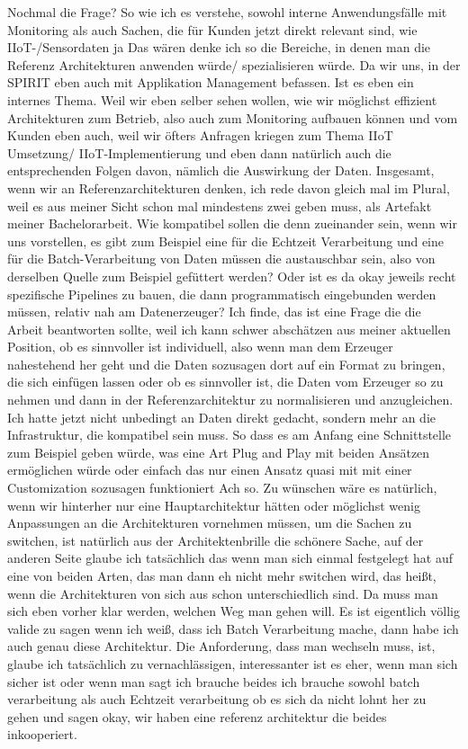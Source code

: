 \PA	 Nochmal die Frage?
\LF	So wie ich es verstehe, sowohl interne Anwendungsfälle mit Monitoring als auch Sachen, die für Kunden jetzt direkt relevant sind, wie \ac{IIoT}-/Sensordaten
\PA	 ja
\LF	 Das wären denke ich so die Bereiche, in denen man die Referenz Architekturen anwenden würde/ spezialisieren würde.
\PA	 Da wir uns, in der SPIRIT eben auch mit Applikation Management befassen. Ist es eben ein internes Thema. Weil wir eben selber sehen wollen, wie wir möglichst effizient Architekturen zum Betrieb, also auch zum Monitoring aufbauen können und vom Kunden eben auch, weil wir öfters Anfragen kriegen zum Thema \ac{IIoT} Umsetzung/ \ac{IIoT}-Implementierung und eben dann natürlich auch die entsprechenden Folgen davon, nämlich die Auswirkung der Daten.
\LF	Insgesamt, wenn wir an Referenzarchitekturen denken, ich rede davon gleich mal im Plural, weil es aus meiner Sicht schon mal mindestens zwei geben muss, als Artefakt meiner Bachelorarbeit. Wie kompatibel sollen die denn zueinander sein, wenn wir uns vorstellen, es gibt zum Beispiel eine für die Echtzeit Verarbeitung und eine für die Batch-Verarbeitung von Daten müssen die austauschbar sein, also von derselben Quelle zum Beispiel gefüttert werden? Oder ist es da okay jeweils recht spezifische Pipelines zu bauen, die  dann programmatisch eingebunden werden müssen, relativ nah am Datenerzeuger?
\PA	 Ich finde, das ist eine Frage die die Arbeit beantworten sollte, weil ich kann schwer abschätzen aus meiner aktuellen Position, ob es sinnvoller ist individuell, also wenn man dem Erzeuger nahestehend her geht  und  die Daten sozusagen dort auf ein Format zu bringen, die sich einfügen lassen oder ob es sinnvoller ist, die Daten vom Erzeuger so zu nehmen und dann in der Referenzarchitektur zu normalisieren und anzugleichen.
\LF	 Ich hatte jetzt nicht unbedingt an Daten direkt gedacht, sondern mehr an die Infrastruktur, die kompatibel sein muss. So dass es am Anfang eine Schnittstelle zum Beispiel geben würde, was eine Art Plug and Play mit beiden Ansätzen ermöglichen würde oder einfach das nur einen Ansatz quasi mit mit einer Customization sozusagen funktioniert
\PA	Ach so. Zu wünschen wäre es natürlich, wenn wir hinterher nur eine Hauptarchitektur hätten oder möglichst wenig Anpassungen an die Architekturen vornehmen müssen, um die Sachen zu switchen, ist natürlich aus der Architektenbrille die schönere Sache, auf der anderen Seite glaube ich tatsächlich das wenn man sich einmal festgelegt hat auf eine von beiden Arten, das man dann eh nicht mehr switchen wird, das heißt, wenn die Architekturen von sich aus schon unterschiedlich sind. Da muss man sich eben vorher klar werden, welchen Weg man gehen will. Es ist eigentlich völlig valide zu sagen wenn ich weiß, dass ich Batch Verarbeitung mache, dann habe ich auch genau diese Architektur. Die Anforderung, dass man wechseln muss, ist, glaube ich tatsächlich zu vernachlässigen, interessanter ist es eher, wenn man sich sicher ist oder wenn man sagt ich brauche beides ich brauche sowohl batch verarbeitung als auch Echtzeit verarbeitung ob es sich da nicht lohnt her zu gehen und sagen okay, wir haben eine referenz architektur die beides inkooperiert.
